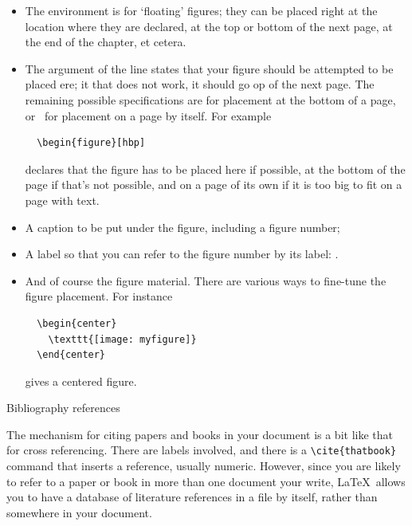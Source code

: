 \begin{itemize}
\item The  environment is for `floating' figures; they can
  be placed right at the location where they are declared, at the top
  or bottom of the next page, at the end of the chapter, et cetera.
\item The \n{[ht]} argument of the  line
  states that your figure should be attempted to be placed ere; it
  that does not work, it should go op of the next page. The
  remaining possible specifications are  for placement at the bottom of a
  page, or ~for placement on a page by itself. For example
\begin{verbatim}
  \begin{figure}[hbp]
\end{verbatim}
  declares that the figure has to be placed here if possible, at the
  bottom of the page if that's not possible, and on a page of its
  own if it is too big to fit on a page with text.
\item A caption to be put under the figure, including a figure number;
\item A label so that you can refer to the figure number by its label:
  .
\item And of course the figure material. There are various ways to
  fine-tune the figure placement. For instance
\begin{verbatim}
  \begin{center}
    \texttt{[image: myfigure]}
  \end{center}
\end{verbatim}
  gives a centered figure.
\end{itemize}

 {Bibliography references}
\label{sec:bib-latex}

The mechanism for citing papers and books in your document is a bit
like that for cross referencing. There are labels involved, and there
is a \verb+\cite{thatbook}+ command that inserts a reference, usually
numeric. However, since you are likely to refer to a paper or book in
more than one document your write, \LaTeX\ allows you to have a
database of literature references in a file by itself,
rather than somewhere in your document.

